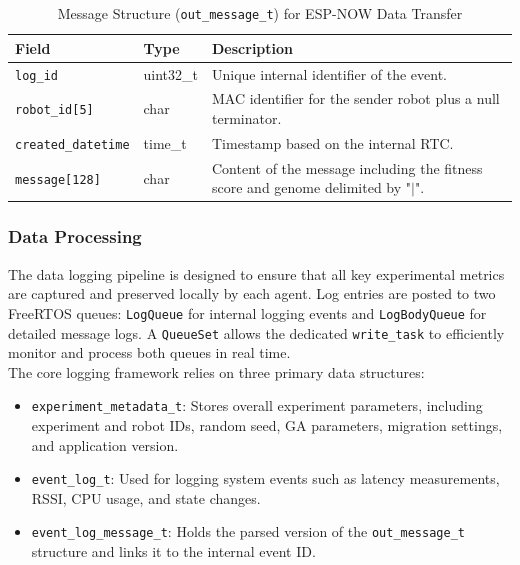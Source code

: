 \documentclass[conference]{IEEEtran}
\begin{document}
\begin{table}[h]
  \centering
  \caption{Message Structure (\texttt{out\_message\_t}) for ESP-NOW Data Transfer}
  \label{tab:out_message}
  \begin{tabular}{l l p{4cm}}
    \toprule
    \textbf{Field} & \textbf{Type} & \textbf{Description} \\
    \midrule
    \texttt{log\_id} & uint32\_t & Unique internal identifier of the event.\\
    \texttt{robot\_id[5]} & char & MAC identifier for the sender robot plus a null terminator.\\
    \texttt{created\_datetime} & time\_t & Timestamp based on the internal RTC.\\
    \texttt{message[128]} & char & Content of the message including the fitness score and genome delimited by "$|$".\\
    \bottomrule
  \end{tabular}
\end{table}

\subsubsection{Data Processing}

The data logging pipeline is designed to ensure that all key experimental metrics are captured and preserved locally by each agent. Log entries are posted to two FreeRTOS queues: \texttt{LogQueue} for internal logging events and \texttt{LogBodyQueue} for detailed message logs. A \texttt{QueueSet} allows the dedicated \texttt{write\_task} to efficiently monitor and process both queues in real time.\\

The core logging framework relies on three primary data structures:
\begin{itemize}
    \item \texttt{experiment\_metadata\_t}: Stores overall experiment parameters, including experiment and robot IDs, random seed, GA parameters, migration settings, and application version.
    \item \texttt{event\_log\_t}: Used for logging system events such as latency measurements, RSSI, CPU usage, and state changes.
    \item \texttt{event\_log\_message\_t}: Holds the parsed version of the \texttt{out\_message\_t} structure and links it to the internal event ID.
\end{itemize}
\end{document}
